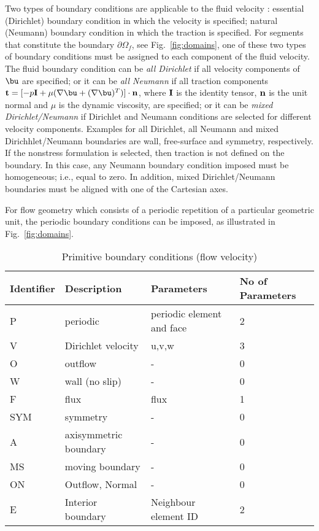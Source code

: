 Two types of boundary conditions are applicable to the
fluid velocity : essential (Dirichlet) boundary
condition in which the velocity is specified;
natural (Neumann) boundary condition in which the traction
is specified.
For segments that constitute the boundary \(\partial \Omega_f\), see Fig.~\ref{fig:domains},
one of these two types of boundary conditions must be
assigned to each component of the fluid velocity.
The fluid boundary condition can be {\em all Dirichlet}
if all velocity components of \(\bu\) are
specified; or it can be {\em all Neumann} if all traction components
\({\bf t} = [-p {\bf I} + \mu (\nabla \bu +
(\nabla \bu)^{T})] \cdot {\bf n}\), where
\({\bf I}\) is the identity tensor, \({\bf n}\) is the unit normal
and \(\mu\) is the dynamic viscosity, are specified;
or it can be {\em mixed Dirichlet/Neumann}
if Dirichlet and Neumann conditions are selected for different
velocity components.
Examples for all Dirichlet, all Neumann and mixed Dirichhlet/Neumann
boundaries are wall, free-surface and symmetry, respectively.
If the nonstress formulation is selected, then traction
is not defined on the boundary.
In this case, any Neumann boundary condition imposed must be homogeneous;
i.e., equal to zero.
In addition, mixed Dirichlet/Neumann boundaries must be aligned with
one of the Cartesian axes.

For flow geometry which consists of
a periodic repetition of a particular geometric unit,
the periodic boundary conditions can be imposed,
as illustrated in Fig.~\ref{fig:domains}.

\begin{table}
\begin{tabular}{ |l|l|l|l| }
   \hline
   Identifier & Description & Parameters&No of Parameters\\ \hline \hline
P    &   periodic                        &   periodic element and face & 2 \\
V    &   Dirichlet velocity              &   u,v,w                      &3 \\
O    &   outflow                         &   -                          &0  \\
W    &   wall (no slip)                  &   -                         & 0    \\                           
F    &   flux                            &   flux                      & 1\\
SYM  &   symmetry                        &   -                         & 0\\
A    &   axisymmetric boundary          &    -                         & 0\\
MS   &   moving boundary                 &   -                         & 0\\
ON   &   Outflow, Normal   &  -  &  0\\
E   &   Interior boundary   &  Neighbour element ID  &  2\\
   \hline
\end{tabular}
\caption{Primitive boundary conditions (flow velocity)}\label{tab:primitiveBCf}
\end{table}

